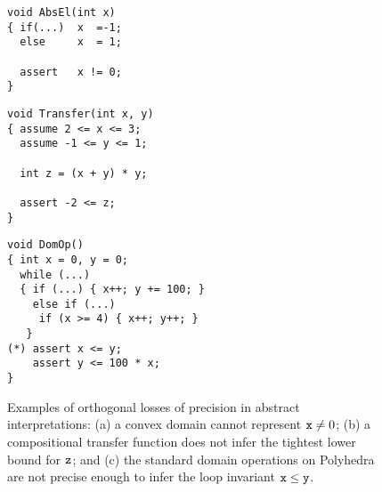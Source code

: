 \documentclass{llncs}
\newcommand{\sopra}{\vspace{-.3cm}}
\begin{document}
\begin{figure}[t]
  \begin{subfloat}
    \begin{minipage}{3cm}
\begin{verbatim}
void AbsEl(int x) 
{ if(...)  x  =-1; 
  else     x  = 1; 

  assert   x != 0; 
}
\end{verbatim}
    \end{minipage}
    \caption{}
    \label{fig:gathering1}
  \end{subfloat}    
  \begin{subfloat}
    \begin{minipage}{3.1cm}
\begin{verbatim}
void Transfer(int x, y) 
{ assume 2 <= x <= 3;
  assume -1 <= y <= 1;  
  
  int z = (x + y) * y;

  assert -2 <= z; 
}
\end{verbatim}
    \end{minipage}
\caption{}
\label{fig:transfer}
  \end{subfloat}
\qquad
  \begin{subfloat}
    \begin{minipage}{4cm}
\begin{verbatim}
void DomOp() 
{ int x = 0, y = 0;
  while (...) 
  { if (...) { x++; y += 100; }
    else if (...)  
     if (x >= 4) { x++; y++; } 
   }
(*) assert x <= y;
    assert y <= 100 * x; 
}
\end{verbatim}
    \end{minipage}
    \caption{}
\label{fig:gathering2}
  \end{subfloat}

\caption{Examples of orthogonal losses of precision in abstract interpretations:
(a) a convex domain cannot represent $\mathtt{x} \neq 0$; 
(b) a compositional transfer function does not infer the tightest
lower bound for $\mathtt{z}$; and  
(c) the standard domain operations on Polyhedra are not precise enough to infer the loop invariant $\mathtt{x} \leq \mathtt{y}$.}
\label{fig:gathering}
\sopra\sopra
\end{figure}
\end{document}
